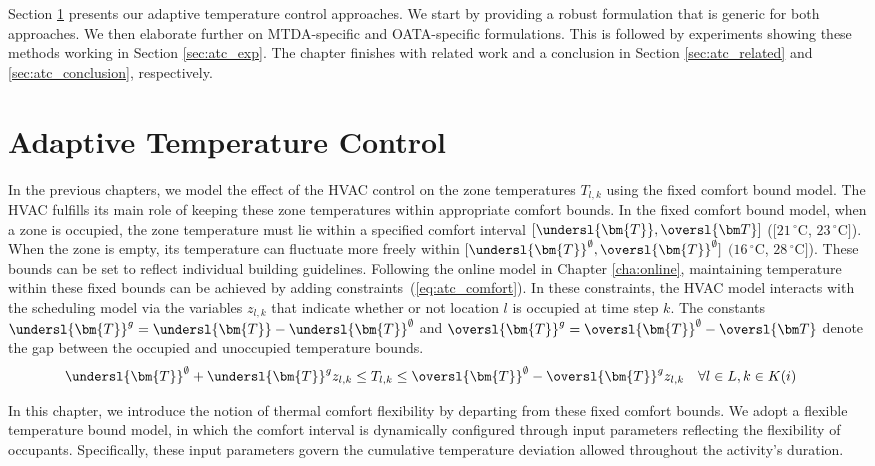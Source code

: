 Section \ref{sec:atc} presents our adaptive temperature control approaches. We start by providing a robust formulation that is generic for both approaches. We then elaborate further on MTDA-specific and OATA-specific formulations. This is followed by experiments showing these methods working in Section \ref{sec:atc_exp}. The chapter finishes with related work and a conclusion in Section \ref{sec:atc_related} and \ref{sec:atc_conclusion}, respectively.


\section{Adaptive Temperature Control} \label{sec:atc}

In the previous chapters, we model the effect of the HVAC control on the zone temperatures $T_{l,k}$ using the fixed comfort bound model. The HVAC fulfills its main role of keeping these zone temperatures within appropriate comfort bounds. In the fixed comfort bound model, when a zone is occupied, the zone temperature must lie within a specified comfort interval $[\undersl{\bm{T}}, \oversl{\bm T}]$ ($[21\,^{\circ}\mathrm{C}$, $23\,^{\circ}\mathrm{C}]$).
When the zone is empty, its temperature can fluctuate more freely within $[\undersl{\bm{T}}^{\emptyset}, \oversl{\bm{T}}^{\emptyset}]$  $(16\,^{\circ}\mathrm{C}$, $28\,^{\circ}\mathrm{C}]$). These bounds can be set to reflect individual building guidelines. Following the online model in Chapter \ref{cha:online}, maintaining temperature within these fixed bounds can be achieved by adding constraints~(\ref{eq:atc_comfort}). In these constraints, the HVAC model interacts with the scheduling model via the variables $z_{l,k}$ that indicate whether or not location $l$ is occupied at time step $k$.
The constants $\undersl{\bm{T}}^{g} = \undersl{\bm{T}}-\undersl{\bm{T}}^{\emptyset}$ and $\oversl{\bm{T}}^{g}=\oversl{\bm{T}}^{\emptyset}-\oversl{\bm T}$ denote the gap between the occupied and unoccupied temperature bounds. %
\begin{align}
\undersl{\bm{T}}^{\emptyset} + \undersl{\bm{T}}^gz_{l,k} &\leq T_{l,k} \leq \oversl{\bm{T}}^{\emptyset} - \oversl{\bm{T}}^gz_{l,k} \quad \forall l\in L , k \in K(i) \label{eq:atc_comfort}
\end{align}

In this chapter, we introduce the notion of thermal comfort flexibility %
by departing from these fixed comfort bounds. We adopt a flexible temperature bound model, in which the comfort interval is dynamically configured through input parameters reflecting the flexibility of occupants. Specifically, these input parameters govern the cumulative temperature deviation allowed throughout the activity's duration. 

